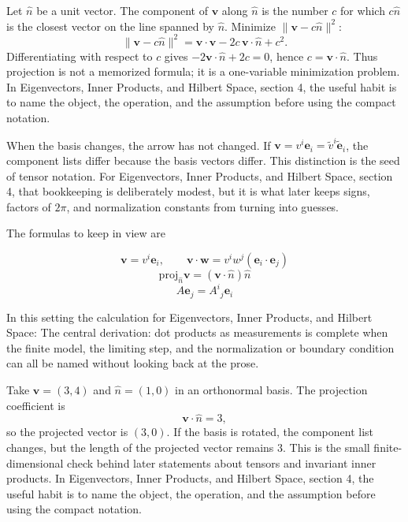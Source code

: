 Let \(\hat n\) be a unit vector.  The component of \(\bm v\) along \(\hat n\) is the number \(c\) for which \(c\hat n\) is the closest vector on the line spanned by \(\hat n\).  Minimize \(\|\bm v-c\hat n\|^2\):
\[
  \|\bm v-c\hat n\|^2=\bm v\cdot\bm v-2c\,\bm v\cdot\hat n+c^2.
\]
Differentiating with respect to \(c\) gives \(-2\bm v\cdot\hat n+2c=0\), hence \(c=\bm v\cdot\hat n\).  Thus projection is not a memorized formula; it is a one-variable minimization problem.  In Eigenvectors, Inner Products, and Hilbert Space, section 4, the useful habit is to name the object, the operation, and the assumption before using the compact notation.

When the basis changes, the arrow has not changed.  If \(\bm v=v^i\bm e_i=\tilde v^i\tilde{\bm e}_i\), the component lists differ because the basis vectors differ.  This distinction is the seed of tensor notation.  For Eigenvectors, Inner Products, and Hilbert Space, section 4, that bookkeeping is deliberately modest, but it is what later keeps signs, factors of \(2\pi\), and normalization constants from turning into guesses.

The formulas to keep in view are

\[
  \bm v=v^i\bm e_i,\qquad \bm v\cdot\bm w=v^iw^j(\bm e_i\cdot\bm e_j)
\]
\[
  \mathrm{proj}_{\hat n}\bm v=(\bm v\cdot\hat n)\hat n
\]
\[
  A\bm e_j=A^i{}_j\bm e_i
\]

In this setting the calculation for Eigenvectors, Inner Products, and Hilbert Space: The central derivation: dot products as measurements is complete when the finite model, the limiting step, and the normalization or boundary condition can all be named without looking back at the prose.




\begin{example}
Take \(\bm v=(3,4)\) and \(\hat n=(1,0)\) in an orthonormal basis.  The projection coefficient is
\[
  \bm v\cdot\hat n=3,
\]
so the projected vector is \((3,0)\).  If the basis is rotated, the component list changes, but the length of the projected vector remains \(3\).  This is the small finite-dimensional check behind later statements about tensors and invariant inner products.  In Eigenvectors, Inner Products, and Hilbert Space, section 4, the useful habit is to name the object, the operation, and the assumption before using the compact notation.
\end{example}



